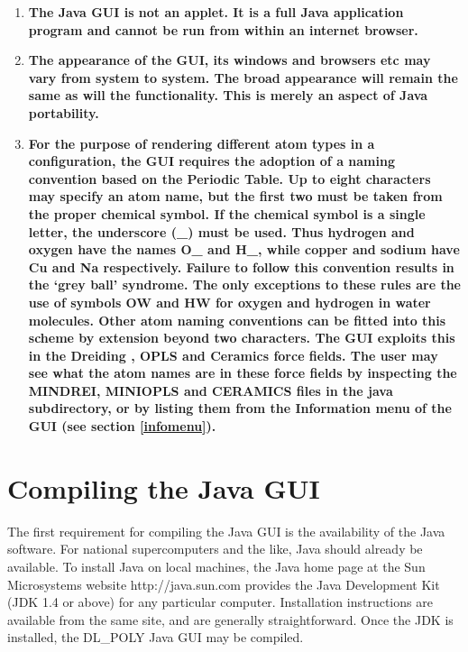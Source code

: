 \begin{enumerate}
\item {\bf The \DD{} Java GUI is not an applet. It is a full Java
application program and cannot be run from within an internet
browser.}
\item {\bf The appearance of the GUI, its windows and browsers
etc may vary from system to system. The broad appearance will remain
the same as will the functionality. This is merely an aspect of Java
portability.}
\item {\bf \label{atomnames}
For the purpose of rendering different atom types in a
configuration, the GUI requires the adoption of a naming convention
based on the Periodic Table. Up to eight characters may specify an
atom name, but the first two must be taken from the proper chemical
symbol. If the chemical symbol is a single letter, the underscore (\_)
must be used. Thus hydrogen and oxygen have the names O\_ and H\_,
while copper and sodium have Cu and Na respectively. Failure to
follow this convention results in the `grey ball' syndrome. The only
exceptions to these rules are the use of symbols OW and HW for oxygen
and hydrogen in water molecules. Other atom naming conventions can be
fitted into this scheme by extension beyond two characters. The GUI
exploits this in the Dreiding
\cite{mayo-90a}, OPLS \cite{jorgensen-84a}
and Ceramics \cite{lewis-85a,bush-94a} 
force fields. The user may see what the atom
names are in these force fields by inspecting the MINDREI, MINIOPLS and
CERAMICS files in the java subdirectory, or by listing them from the
Information menu of the GUI (see section \ref{infomenu}).}
\end{enumerate}

\section{Compiling the Java GUI}

The first requirement for compiling the Java GUI is the availability of the
Java software. For national supercomputers and the like, Java should already
be available. To install Java on local machines, the Java home page at the Sun
Microsystems website http://java.sun.com provides the Java Development Kit
(JDK 1.4 or above) for any particular computer. Installation instructions are
available from the same site, and are generally straightforward. Once the JDK
is installed, the DL\_POLY Java GUI may be compiled.

